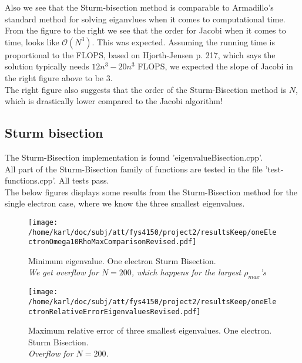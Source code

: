 \documentclass{article}
\begin{document}
Also we see that the Sturm-bisection method is comparable to Armadillo's standard method for solving eiganvlues when it comes to computational time.\\

From the figure to the right we see that the order for Jacobi when it comes to time, looks like $\mathcal{O}(N^3).$ This was expected. Assuming the running time is proportional to the FLOPS, based on Hjorth-Jensen \cite{MHJ} p. 217, which says the solution typically needs $12n^3-20n^3$ FLOPS, we expected the slope of Jacobi in the right figure above to be 3. \\

The right figure also suggests that the order of the Sturm-Bisection method is $N$, which is drastically lower compared to the Jacobi algorithm! 



\subsection{Sturm bisection}
The Sturm-Bisection implementation is found 'eigenvalueBisection.cpp'.\\

All part of the Sturm-Bisection family of functions are tested in the file 'test-functions.cpp'. All tests pass. \\

The below figures displays some results from the Sturm-Bisection method for the single electron case, where we know the three smallest eigenvalues.

\begin{minipage}{.49\textwidth} %
	\begin{figure}[H]
		\centering
		\texttt{[image: /home/karl/doc/subj/att/fys4150/project2/resultsKeep/oneElectronOmega10RhoMaxComparisonRevised.pdf]}
		\caption{Minimum eigenvalue. One electron Sturm Bisection.\\ \textit{We get overflow for $N=200$, which happens for the largest $\rho_{max}$'s}}
		\label{1}
	\end{figure}
\end{minipage}\hfill
\begin{minipage}{.49\textwidth}
	\begin{figure}[H]
		\centering
		\texttt{[image: /home/karl/doc/subj/att/fys4150/project2/resultsKeep/oneElectronRelativeErrorEigenvaluesRevised.pdf]}
		\caption{Maximum relative error of three smallest eigenvalues. One electron. Sturm Bisection.\\ \textit{Overflow for $N=200$.}}
		\label{1}
	\end{figure}
\end{minipage}\hfill
\vspace{2ex}
\end{document}

